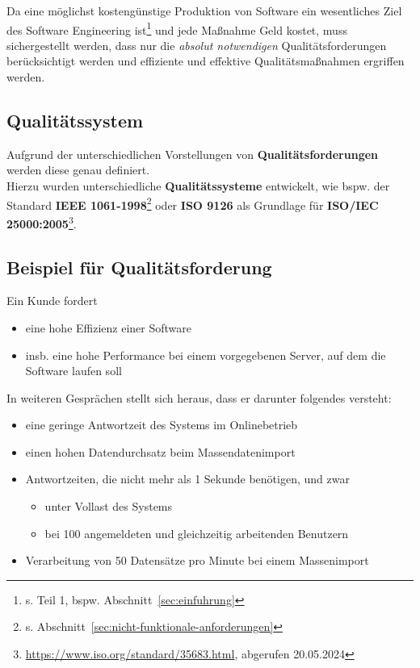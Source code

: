 \noindent
Da eine möglichst kostengünstige Produktion von Software ein wesentliches Ziel des Software Engineering ist\footnote{
s. Teil 1, bspw. Abschnitt~\ref{sec:einfuhrung}
} und jede Maßnahme Geld kostet, muss sichergestellt werden, dass nur die \textit{absolut notwendigen} Qualitätsforderungen berücksichtigt werden und effiziente und effektive Qualitätsmaßnahmen ergriffen werden.

\subsection*{Qualitätssystem}
Aufgrund der unterschiedlichen Vorstellungen von \textbf{Qualitätsforderungen} werden diese genau definiert.\\
Hierzu wurden unterschiedliche \textbf{Qualitätssysteme} entwickelt, wie bspw. der Standard \textbf{IEEE 1061-1998}\footnote{s. Abschnitt~\ref{sec:nicht-funktionale-anforderungen}} oder \textbf{ISO 9126} als Grundlage für \textbf{ISO/IEC 25000:2005}\footnote{
    \url{https://www.iso.org/standard/35683.html}, abgerufen 20.05.2024
}.

\subsection*{Beispiel für Qualitätsforderung}
Ein Kunde fordert
\begin{itemize}
    \item eine hohe Effizienz einer Software
    \item insb. eine hohe Performance bei einem vorgegebenen Server, auf dem die Software laufen soll
\end{itemize}

\noindent
In weiteren Gesprächen stellt sich heraus, dass er darunter folgendes versteht:

\begin{itemize}
    \item eine geringe Antwortzeit des Systems im Onlinebetrieb
    \item einen hohen Datendurchsatz beim Massendatenimport
    \item Antwortzeiten, die nicht mehr als 1 Sekunde benötigen, und zwar
        \begin{itemize}
            \item unter Vollast des Systems
            \item bei 100 angemeldeten und gleichzeitig arbeitenden Benutzern
        \end{itemize}
    \item Verarbeitung von 50 Datensätze pro Minute bei einem Massenimport
\end{itemize}

